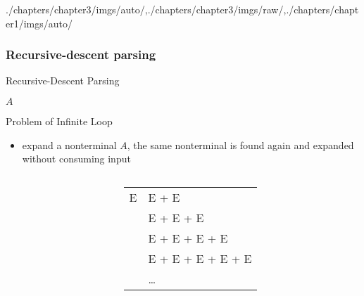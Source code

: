 \begin{graphicspathcontext}{{./chapters/chapter3/imgs/auto/},{./chapters/chapter3/imgs/raw/},{./chapters/chapter1/imgs/auto/}}
\begin{bibunit}[apalike]
\subsubsection{Recursive-descent parsing}
\subsubsectiontableofcontentslide

\begin{frame}{Recursive-Descent Parsing}
	\vspace{.25cm}
	\begin{myprocedure}{$A$}{}\smaller
	\end{myprocedure}
\end{frame}

\begin{frame}{Problem of Infinite Loop}
	\begin{itemize}
	\item {} expand a nonterminal $A$, the same nonterminal is found again and expanded without consuming input
	\end{itemize}
	\vfill
	\begin{columns}
		\begin{column}{.5\linewidth}
			\begin{bnf}
				 \\
				 \\
				 \\
				 \\
			\end{bnf}
		\end{column}
		\begin{column}{.5\linewidth}
			\begin{tabular}{@{}ll@{}}
				E & \deriv E \bnfts+ E \\
				& \deriv E \bnfts+ E \bnfts+ E \\
				& \deriv E \bnfts+ E \bnfts+ E \bnfts+ E \\
				& \deriv E \bnfts+ E \bnfts+ E \bnfts+ E \bnfts+ E \\
				& \deriv \dots
			\end{tabular}
		\end{column}
	\end{columns}	
\end{frame}


\end{bibunit}
\end{graphicspathcontext}

